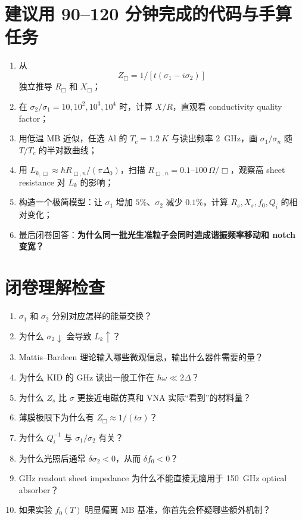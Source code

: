\documentclass[11pt,a4paper,openany]{ctexrep}
\begin{document}
\section{建议用 90--120 分钟完成的代码与手算任务}

\begin{enumerate}
  \item 从
  \[
  Z_{\Box}=1/[t(\sigma_1-i\sigma_2)]
  \]
  独立推导 $R_{\Box}$ 和 $X_{\Box}$；
  \item 在 $\sigma_2/\sigma_1=10,10^2,10^3,10^4$ 时，计算 $X/R$，直观看 conductivity quality factor；
  \item 用低温 MB 近似，任选 Al 的 $T_c=\SI{1.2}{K}$ 与读出频率 \SI{2}{GHz}，画 $\sigma_1/\sigma_n$ 随 $T/T_c$ 的半对数曲线；
  \item 用 $L_{k,\Box}\approx\hbar R_{\Box,n}/(\pi\Delta_0)$，扫描 $R_{\Box,n}=0.1$--$100\,\Omega/\Box$，观察高 sheet resistance 对 $L_k$ 的影响；
  \item 构造一个极简模型：让 $\sigma_1$ 增加 $5\%$、$\sigma_2$ 减少 $0.1\%$，计算 $R_s,X_s,f_0,Q_i$ 的相对变化；
  \item 最后闭卷回答：\textbf{为什么同一批光生准粒子会同时造成谐振频率移动和 notch 变宽？}
\end{enumerate}

\section{闭卷理解检查}

\begin{checkpointbox}
\begin{enumerate}
  \item $\sigma_1$ 和 $\sigma_2$ 分别对应怎样的能量交换？
  \item 为什么 $\sigma_2\downarrow$ 会导致 $L_k\uparrow$？
  \item Mattis--Bardeen 理论输入哪些微观信息，输出什么器件需要的量？
  \item 为什么 KID 的 GHz 读出一般工作在 $\hbar\omega\ll2\Delta$？
  \item 为什么 $Z_s$ 比 $\sigma$ 更接近电磁仿真和 VNA 实际“看到”的材料量？
  \item 薄膜极限下为什么有 $Z_{\Box}\approx1/(t\sigma)$？
  \item 为什么 $Q_i^{-1}$ 与 $\sigma_1/\sigma_2$ 有关？
  \item 为什么光照后通常 $\delta\sigma_2<0$，从而 $\delta f_0<0$？
  \item GHz readout sheet impedance 为什么不能直接无脑用于 \SI{150}{GHz} optical absorber？
  \item 如果实验 $f_0(T)$ 明显偏离 MB 基准，你首先会怀疑哪些额外机制？
\end{enumerate}
\end{checkpointbox}
\end{document}
